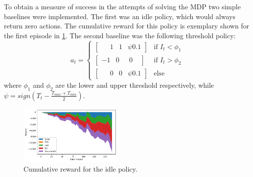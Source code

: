 To obtain a measure of success in the attempts of solving the MDP two simple baselines were implemented. The first was an idle policy, which would always return zero actions. The cumulative reward for this policy is exemplary shown for the first episode in \ref{fig:reward_idle}. The second baseline was the following threshold policy:
\begin{equation}
    a_t = \left\{
        \begin{array}{ll}
            \begin{bmatrix} \phantom{-}1 & 1 & \psi0.1 \end{bmatrix} & \text{if } I_t < \phi_1 \\
            \begin{bmatrix} -1 & 0 & \phantom{\psi}0\phantom{.1} \end{bmatrix} & \text{if } I_t > \phi_2 \\
            \begin{bmatrix} \phantom{-}0 & 0 & \psi0.1 \end{bmatrix} & \text{else}
        \end{array}
    \right.
\end{equation}
where $\phi_1$ and $\phi_2$ are the lower and upper threshold respectively, while $\psi = sign(T_t -\frac{T_{max} + T_{min}}{2})$.
\begin{figure}[H]
    \centering
    \includegraphics[width=0.45\textwidth]{figures/idle_reward.png}
    \caption{Cumulative reward for the idle policy.}
    \label{fig:reward_idle}
\end{figure}


